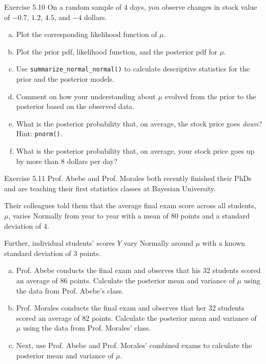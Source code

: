 \documentclass[aspectratio=43,11pt]{beamer}
\begin{document}
{\begin{frame}[plain]{Exercise 5.10}
\medskip
On a random sample of 4 days, you observe changes in stock value of $-0.7$, $1.2$, $4.5$, and $-4$ dollars.

\medskip
\begin{enumerate}[a.]
    \item Plot the corresponding likelihood function of $\mu$.
    \item Plot the prior pdf, likelihood function, and the posterior pdf for $\mu$.
    \item Use \texttt{summarize\_normal\_normal()} to calculate descriptive statistics for the prior and the posterior models.
    \item Comment on how your understanding about $\mu$ evolved from the prior to the posterior based on the observed data.
    \item What is the posterior probability that, on average, the stock price goes \textit{down}? Hint: \texttt{pnorm()}.
    \item What is the posterior probability that, on average, your stock price goes up by more than 8 dollars per day?
\end{enumerate}
\end{frame}

\begin{frame}[plain]{Exercise 5.11}
\small
Prof. Abebe and Prof. Morales both recently finished their PhDs and are teaching their first statistics classes at Bayesian University.

\medskip
Their colleagues told them that the average final exam score across all students, $\mu$, varies Normally from year to year with a mean of 80 points and a standard deviation of 4.

\medskip
Further, individual students' scores $Y$ vary Normally around $\mu$ with a known standard deviation of 3 points.

\medskip
\begin{enumerate}[a.]
    \item Prof. Abebe conducts the final exam and observes that his 32 students scored an average of 86 points. Calculate the posterior mean and variance of $\mu$ using the data from Prof. Abebe's class.
    \item Prof. Morales conducts the final exam and observes that her 32 students scored an average of 82 points. Calculate the posterior mean and variance of $\mu$ using the data from Prof. Morales' class.
    \item Next, use Prof. Abebe and Prof. Morales' combined exams to calculate the posterior mean and variance of $\mu$.
\end{enumerate}
\end{frame}

}
\end{document}
